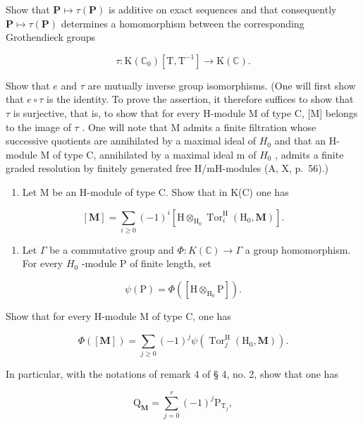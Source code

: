 Show that \(\mathbf{P} \mapsto \tau(\mathbf{P})\) is additive on exact sequences and that consequently \(\mathbf{P} \mapsto \tau(\mathbf{P})\) determines a homomorphism between the corresponding Grothendieck groups

\[
\tau : \mathrm{K} (\mathbb {C} _ {0}) [ \mathrm{T}, \mathrm{T} ^ {- 1} ] \rightarrow \mathrm{K} (\mathbb {C}).
\]

Show that \(e\) and \(\tau\) are mutually inverse group isomorphisms. (One will first show that \(e \circ \tau\) is the identity. To prove the assertion, it therefore suffices to show that \(\tau\) is surjective, that is, to show that for every H-module M of type C, {[}M{]} belongs to the image of \(\tau\) . One will note that M admits a finite filtration whose successive quotients are annihilated by a maximal ideal of \(H_0\) and that an H-module M of type C, annihilated by a maximal ideal m of \(H_0\) , admits a finite graded resolution by finitely generated free H/mH-modules (A, X, p.~56).)

\begin{enumerate}
\def\labelenumi{\alph{enumi})}
\setcounter{enumi}{4}
\tightlist
\item
  Let M be an H-module of type C. Show that in K(C) one has
\end{enumerate}

\[
[ \mathbf {M} ] = \sum_ {i \geqslant 0} (- 1) ^ {i} [ \mathrm{H} \otimes_ {\mathrm{H} _ {0}} \operatorname{Tor} _ {i} ^ {\mathrm{H}} (\mathrm{H} _ {0}, \mathbf {M}) ].
\]

\begin{enumerate}
\def\labelenumi{\alph{enumi})}
\setcounter{enumi}{5}
\tightlist
\item
  Let \(\Gamma\) be a commutative group and \(\Phi : K(\mathbb{C}) \to \Gamma\) a group homomorphism. For every \(H_0\) -module P of finite length, set
\end{enumerate}

\[
\psi (\mathrm{P}) = \Phi ([ \mathrm{H} \otimes_ {\mathrm{H} _ {0}} \mathrm{P} ]).
\]

Show that for every H-module M of type C, one has

\[
\Phi ([ \mathbf {M} ]) = \sum_ {j \geqslant 0} (- 1) ^ {j} \psi (\operatorname{Tor} _ {j} ^ {\mathrm{H}} (\mathrm{H} _ {0}, \mathbf {M})).
\]

In particular, with the notations of remark 4 of § 4, no. 2, show that one has

\[
\mathrm{Q} _ {\mathbf {M}} = \sum_ {j = 0} ^ {r} (- 1) ^ {j} \mathrm{P} _ {\mathrm{T} _ {j}},
\]

